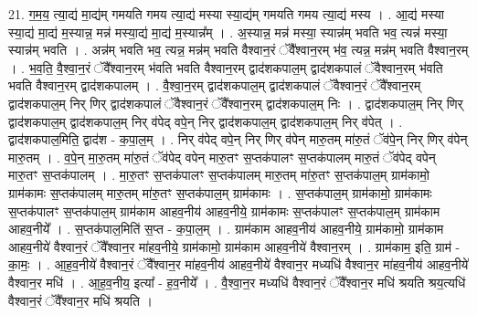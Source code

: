 \documentclass[17pt]{extarticle}
\begin{document}
21. ग॒म॒य॒ त्या॒द्य॑ मा॒द्य॑म् गमयति गमय त्या॒द्य॑ मस्या स्या॒द्य॑म् गमयति गमय त्या॒द्य॑ मस्य । . आ॒द्य॑ मस्या स्या॒द्य॑ मा॒द्य॑ म॒स्यान्न॒ मन्न॑ मस्या॒द्य॑ मा॒द्य॑ म॒स्यान्न᳚म् । . अ॒स्यान्न॒ मन्न॑ मस्या॒ स्यान्न॑म् भवति भव॒ त्यन्न॑ मस्या॒ स्यान्न॑म् भवति । . अन्न॑म् भवति भव॒ त्यन्न॒ मन्न॑म् भवति वैश्वान॒रं ॅवै᳚श्वान॒रम् भ॑व॒ त्यन्न॒ मन्न॑म् भवति वैश्वान॒रम् । . भ॒व॒ति॒ वै॒श्वा॒न॒रं ॅवै᳚श्वान॒रम् भ॑वति भवति वैश्वान॒रम् द्वाद॑शकपाल॒म् द्वाद॑शकपालं ॅवैश्वान॒रम् भ॑वति भवति वैश्वान॒रम् द्वाद॑शकपालम् । . वै॒श्वा॒न॒रम् द्वाद॑शकपाल॒म् द्वाद॑शकपालं ॅवैश्वान॒रं ॅवै᳚श्वान॒रम् द्वाद॑शकपाल॒म् निर् णिर् द्वाद॑शकपालं ॅवैश्वान॒रं ॅवै᳚श्वान॒रम् द्वाद॑शकपाल॒म् निः । . द्वाद॑शकपाल॒म् निर् णिर् द्वाद॑शकपाल॒म् द्वाद॑शकपाल॒म् निर् व॑पेद् वपे॒न् निर् द्वाद॑शकपाल॒म् द्वाद॑शकपाल॒म् निर् व॑पेत् । . द्वाद॑शकपाल॒मिति॒ द्वाद॑श - क॒पा॒ल॒म् । . निर् व॑पेद् वपे॒न् निर् णिर् व॑पेन् मारु॒तम् मा॑रु॒तं ॅव॑पे॒न् निर् णिर् व॑पेन् मारु॒तम् । . व॒पे॒न् मा॒रु॒तम् मा॑रु॒तं ॅव॑पेद् वपेन् मारु॒तꣳ स॒प्तक॑पालꣳ स॒प्तक॑पालम् मारु॒तं ॅव॑पेद् वपेन् मारु॒तꣳ स॒प्तक॑पालम् । . मा॒रु॒तꣳ स॒प्तक॑पालꣳ स॒प्तक॑पालम् मारु॒तम् मा॑रु॒तꣳ स॒प्तक॑पाल॒म् ग्राम॑कामो॒ ग्राम॑कामः स॒प्तक॑पालम् मारु॒तम् मा॑रु॒तꣳ स॒प्तक॑पाल॒म् ग्राम॑कामः । . स॒प्तक॑पाल॒म् ग्राम॑कामो॒ ग्राम॑कामः स॒प्तक॑पालꣳ स॒प्तक॑पाल॒म् ग्राम॑काम आहव॒नीय॑ आहव॒नीये॒ ग्राम॑कामः स॒प्तक॑पालꣳ स॒प्तक॑पाल॒म् ग्राम॑काम आहव॒नीये᳚ । . स॒प्तक॑पाल॒मिति॑ स॒प्त - क॒पा॒ल॒म् । . ग्राम॑काम आहव॒नीय॑ आहव॒नीये॒ ग्राम॑कामो॒ ग्राम॑काम आहव॒नीये॑ वैश्वान॒रं ॅवै᳚श्वान॒र मा॑हव॒नीये॒ ग्राम॑कामो॒ ग्राम॑काम आहव॒नीये॑ वैश्वान॒रम् । . ग्राम॑काम॒ इति॒ ग्राम॑ - का॒मः॒ । . आ॒ह॒व॒नीये॑ वैश्वान॒रं ॅवै᳚श्वान॒र मा॑हव॒नीय॑ आहव॒नीये॑ वैश्वान॒र मध्यधि॑ वैश्वान॒र मा॑हव॒नीय॑ आहव॒नीये॑ वैश्वान॒र मधि॑ । . आ॒ह॒व॒नीय॒ इत्या᳚ - ह॒व॒नीये᳚ । . वै॒श्वा॒न॒र मध्यधि॑ वैश्वान॒रं ॅवै᳚श्वान॒र मधि॑ श्रयति श्रय॒त्यधि॑ वैश्वान॒रं ॅवै᳚श्वान॒र मधि॑ श्रयति । \newline
\end{document}
